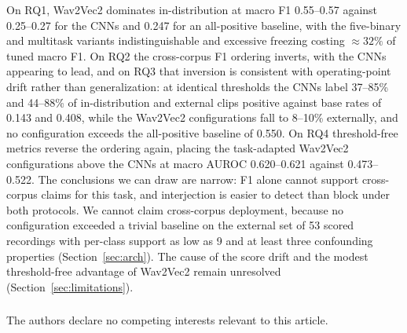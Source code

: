 \documentclass[a4paper,orivec]{llncs}
\begin{document}
On RQ1, Wav2Vec2 dominates in-distribution at macro F1 0.55--0.57 against
0.25--0.27 for the CNNs and 0.247 for an all-positive baseline, with the
five-binary and multitask variants indistinguishable and excessive freezing
costing ${\approx}32\%$ of tuned macro F1. On RQ2 the cross-corpus F1 ordering
inverts, with the CNNs appearing to lead, and on RQ3 that inversion is consistent
with operating-point drift rather than generalization: at identical thresholds the
CNNs label 37--85\% and 44--88\% of in-distribution and external clips positive
against base rates of 0.143 and 0.408, while the Wav2Vec2 configurations fall to
8--10\% externally, and no configuration exceeds the all-positive baseline of
0.550. On RQ4 threshold-free metrics reverse the ordering again, placing the
task-adapted Wav2Vec2 configurations above the CNNs at macro AUROC 0.620--0.621
against 0.473--0.522. The conclusions we can draw are narrow: F1 alone cannot
support cross-corpus claims for this task, and interjection is easier to detect
than block under both protocols. We cannot claim cross-corpus deployment, because
no configuration exceeded a trivial baseline on the external set of 53 scored
recordings with per-class support as low as 9 and at least three confounding
properties (Section~\ref{sec:arch}). The cause of the score drift and the modest
threshold-free advantage of Wav2Vec2 remain unresolved
(Section~\ref{sec:limitations}).

%
%



\begin{credits}
\subsubsection{\discintname}
The authors declare no competing interests relevant to this article.
\end{credits}
%
\end{document}
